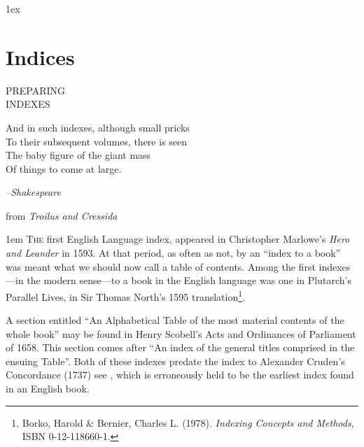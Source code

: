 \parskip1ex 
\chapter{Indices}
\pagebreak

\thispagestyle{empty}
    \begin{leftcolumn}
       \begin{center} 
          \huge \noindent PREPARING\\
                   INDEXES
       \end{center}
     
      \medskip

       {\justifying \small\noindent And in such indexes, although small pricks\\
To their subsequent volumes, there is seen\\
The baby figure of the giant mass\\
Of things to come at large. \par
\hfill \textit{--Shakespeare}\par
\hfill\hfill{ \RaggedRight from \textit{Troilus and Cressida}}}
\medskip
       \par
   \end{leftcolumn}
   \begin{rightcolumn}
      \begin{multicols}{2}
        
\parindent1em      \lettrine{T}{he} first English Language index, appeared in Christopher Marlowe's \textit{Hero and Leander} in 1593. At that period, as often as not, by an ``index to a book'' was meant what we should now call a table of contents. Among the first indexes---in the modern sense---to a book in the English language was one in Plutarch's Parallel Lives, in Sir Thomas North's 1595 translation\footnote{Borko, Harold \& Bernier, Charles L. (1978). \textit{Indexing Concepts and Methods}, ISBN 0-12-118660-1.}.  

A section entitled ``An Alphabetical Table of the most material contents of the whole book'' may be found in Henry Scobell's Acts and Ordinances of Parliament of 1658. This section comes after ``An index of the general titles comprised in the ensuing Table''. Both of these indexes predate the index to Alexander Cruden's Concordance (1737) see \citep{farrow96}, which is erroneously held to be the earliest index found in an English book.

      \end{multicols}
   \end{rightcolumn}
\stoptemplate

